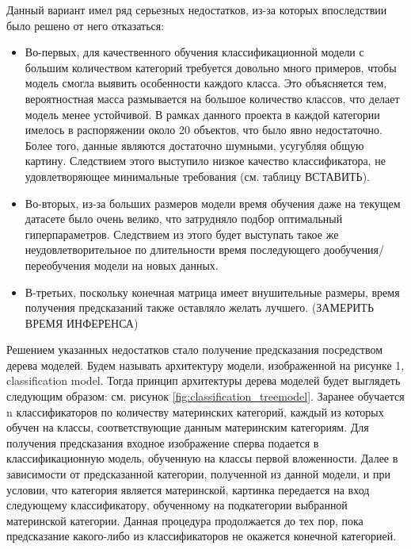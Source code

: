 \documentclass[a4paper,12pt]{extarticle}
\begin{document}
Данный вариант имел ряд серьезных недостатков, из-за которых впоследствии было решено от него отказаться:
\begin{itemize}
	\item Во-первых, для качественного обучения классификационной модели с большим количеством категорий требуется довольно много примеров, чтобы модель смогла выявить особенности каждого класса. Это объясняется тем, вероятностная масса размывается на большое количество классов, что делает модель менее устойчивой. В рамках данного проекта в каждой категории имелось в распоряжении около 20 объектов, что было явно недостаточно. Более того, данные являются достаточно шумными, усугубляя общую картину. Следствием этого выступило низкое качество классификатора, не удовлетворяющее минимальные требования (см. таблицу ВСТАВИТЬ).
	\item Во-вторых, из-за больших размеров модели время обучения даже на текущем датасете было очень велико, что затрудняло подбор оптимальный гиперпараметров. Следствием из этого будет выступать такое же неудовлетворительное по длительности время последующего дообучения/переобучения модели на новых данных.
	\item В-третьих, поскольку конечная матрица имеет внушительные размеры, время получения предсказаний также оставляло желать лучшего. (ЗАМЕРИТЬ ВРЕМЯ ИНФЕРЕНСА)
\end{itemize}

Решением указанных недостатков стало получение предсказания посредством дерева моделей. Будем называть архитектуру модели, изображенной на рисунке 1, classification model. Тогда принцип архитектуры дерева моделей будет выглядеть следующим образом: см. рисунок \ref{fig:classification_treemodel}. Заранее обучается n классификаторов по количеству материнских категорий, каждый из которых обучен на классы, соответствующие данным материнским категориям. Для получения предсказания входное изображение сперва подается в классификационную модель, обученную на классы первой вложенности. Далее в зависимости от предсказанной категории, полученной из данной модели, и при условии, что категория является материнской, картинка передается на вход следующему классификатору, обученному на подкатегории выбранной материнской категории. Данная процедура продолжается до тех пор, пока предсказание какого-либо из классификаторов не окажется конечной категорией.
\end{document}
